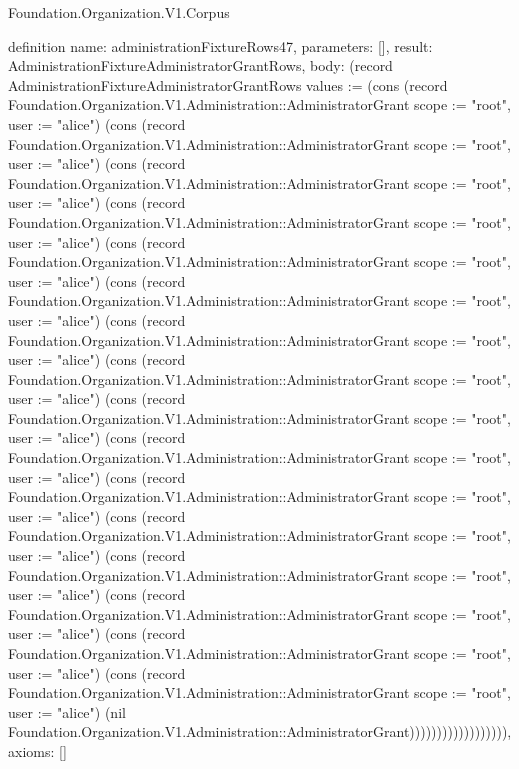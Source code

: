 \begin{lexlean}{Foundation.Organization.V1.Corpus}
\begin{semanticmodule}
definition{
  name: administrationFixtureRows47,
  parameters: [],
  result: AdministrationFixtureAdministratorGrantRows,
  body: (record AdministrationFixtureAdministratorGrantRows {values := (cons (record Foundation.Organization.V1.Administration::AdministratorGrant {scope := "root", user := "alice"}) (cons (record Foundation.Organization.V1.Administration::AdministratorGrant {scope := "root", user := "alice"}) (cons (record Foundation.Organization.V1.Administration::AdministratorGrant {scope := "root", user := "alice"}) (cons (record Foundation.Organization.V1.Administration::AdministratorGrant {scope := "root", user := "alice"}) (cons (record Foundation.Organization.V1.Administration::AdministratorGrant {scope := "root", user := "alice"}) (cons (record Foundation.Organization.V1.Administration::AdministratorGrant {scope := "root", user := "alice"}) (cons (record Foundation.Organization.V1.Administration::AdministratorGrant {scope := "root", user := "alice"}) (cons (record Foundation.Organization.V1.Administration::AdministratorGrant {scope := "root", user := "alice"}) (cons (record Foundation.Organization.V1.Administration::AdministratorGrant {scope := "root", user := "alice"}) (cons (record Foundation.Organization.V1.Administration::AdministratorGrant {scope := "root", user := "alice"}) (cons (record Foundation.Organization.V1.Administration::AdministratorGrant {scope := "root", user := "alice"}) (cons (record Foundation.Organization.V1.Administration::AdministratorGrant {scope := "root", user := "alice"}) (cons (record Foundation.Organization.V1.Administration::AdministratorGrant {scope := "root", user := "alice"}) (cons (record Foundation.Organization.V1.Administration::AdministratorGrant {scope := "root", user := "alice"}) (cons (record Foundation.Organization.V1.Administration::AdministratorGrant {scope := "root", user := "alice"}) (cons (record Foundation.Organization.V1.Administration::AdministratorGrant {scope := "root", user := "alice"}) (nil Foundation.Organization.V1.Administration::AdministratorGrant)))))))))))))))))}),
  axioms: []
}


\end{semanticmodule}
\end{lexlean}
